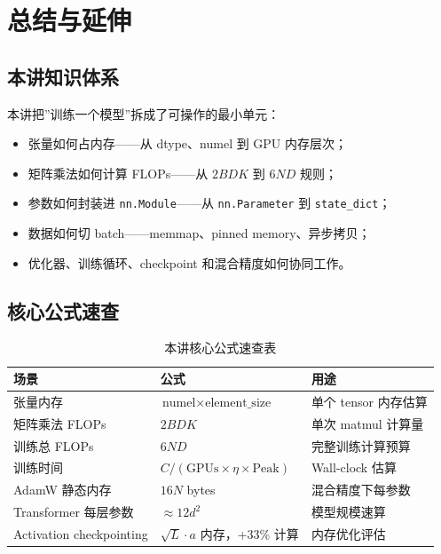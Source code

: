 \section{总结与延伸}

\subsection{本讲知识体系}

本讲把”训练一个模型”拆成了可操作的最小单元：
\begin{itemize}
    \item 张量如何占内存——从 dtype、numel 到 GPU 内存层次；
    \item 矩阵乘法如何计算 FLOPs——从 $2BDK$ 到 $6ND$ 规则；
    \item 参数如何封装进 \texttt{nn.Module}——从 \texttt{nn.Parameter} 到 \texttt{state\_dict}；
    \item 数据如何切 batch——memmap、pinned memory、异步拷贝；
    \item 优化器、训练循环、checkpoint 和混合精度如何协同工作。
\end{itemize}

\subsection{核心公式速查}

\begin{table}[H]
\centering
\begin{tabular}{p{}p{}p{}}
\toprule
\textbf{场景} & \textbf{公式} & \textbf{用途} \\
\midrule
张量内存 & $\text{numel} \times \text{element\_size}$ & 单个 tensor 内存估算 \\
矩阵乘法 FLOPs & $2BDK$ & 单次 matmul 计算量 \\
训练总 FLOPs & $6ND$ & 完整训练计算预算 \\
训练时间 & $C / (\text{GPUs} \times \eta \times \text{Peak})$ & Wall-clock 估算 \\
AdamW 静态内存 & $16N$ bytes & 混合精度下每参数 \\
Transformer 每层参数 & $\approx 12d^2$ & 模型规模速算 \\
Activation checkpointing & $\sqrt{L} \cdot a$ 内存，+33\% 计算 & 内存优化评估 \\
\bottomrule
\end{tabular}
\caption{本讲核心公式速查表}
\end{table}

